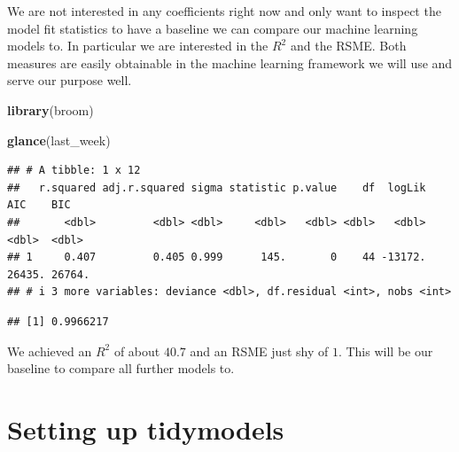 \documentclass[
]{book}
\newenvironment{Shaded}{\begin{snugshade}}{\end{snugshade}}
\newcommand{\AttributeTok}[1]{\textcolor[rgb]{0.13,0.29,0.53}{#1}}
\newcommand{\FunctionTok}[1]{\textcolor[rgb]{0.13,0.29,0.53}{\textbf{#1}}}
\newcommand{\NormalTok}[1]{#1}
\newcommand{\OtherTok}[1]{\textcolor[rgb]{0.56,0.35,0.01}{#1}}
\newcommand{\SpecialCharTok}[1]{\textcolor[rgb]{0.81,0.36,0.00}{\textbf{#1}}}
\begin{document}
We are not interested in any coefficients right now and only want to inspect the
model fit statistics to have a baseline we can compare our machine learning
models to. In particular we are interested in the \(R^2\) and the RSME. Both
measures are easily obtainable in the machine learning framework we will use and
serve our purpose well.

\begin{Shaded}
\begin{Highlighting}[]
\FunctionTok{library}\NormalTok{(broom)}

\FunctionTok{glance}\NormalTok{(last\_week)}
\end{Highlighting}
\end{Shaded}

\begin{verbatim}
## # A tibble: 1 x 12
##   r.squared adj.r.squared sigma statistic p.value    df  logLik    AIC    BIC
##       <dbl>         <dbl> <dbl>     <dbl>   <dbl> <dbl>   <dbl>  <dbl>  <dbl>
## 1     0.407         0.405 0.999      145.       0    44 -13172. 26435. 26764.
## # i 3 more variables: deviance <dbl>, df.residual <int>, nobs <int>
\end{verbatim}

\begin{Shaded}
\end{Shaded}

\begin{verbatim}
## [1] 0.9966217
\end{verbatim}

We achieved an \(R^2\) of about \(40.7\) and an RSME just shy of \(1\). This will be
our baseline to compare all further models to.

\hypertarget{setting-up-tidymodels}{%
\section{Setting up tidymodels}\label{setting-up-tidymodels}}
\end{document}
